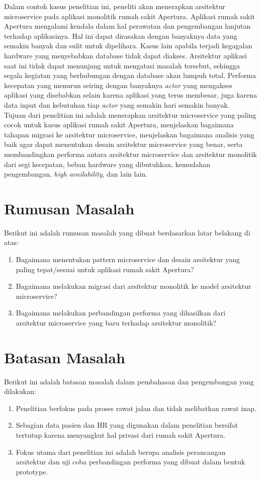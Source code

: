 Dalam contoh kasus penelitian ini, peneliti akan menerapkan arsitektur microservice pada aplikasi monolitik rumah sakit Apertura. Aplikasi rumah sakit Apertura mengalami kendala dalam hal perawatan dan pengembangan lanjutan terhadap aplikasinya. Hal ini dapat dirasakan dengan banyaknya data yang semakin banyak dan sulit untuk dipelihara. Kasus lain apabila terjadi kegagalan hardware yang menyebabkan database tidak dapat diakses. Arsitektur aplikasi saat ini tidak dapat menunjang untuk mengatasi masalah tersebut, sehingga segala kegiatan yang berhubungan dengan database akan lumpuh total. Performa kecepatan yang menurun seiring dengan banyaknya \textit{actor} yang mengakses aplikasi yang disebabkan selain karena aplikasi yang terus membesar, juga karena data input dan kebutuhan tiap \textit{actor} yang semakin hari semakin banyak.\\
Tujuan dari penelitian ini adalah menerapkan arsitektur microservice yang paling cocok untuk kasus aplikasi rumah sakit Apertura, menjelaskan bagaimana tahapan migrasi ke arsitektur microservice, menjelaskan bagaimana analisis yang baik agar dapat menentukan desain arsitektur microservice yang benar, serta membandingkan performa antara arsitektur microservice dan arsitektur monolitik dari segi kecepatan, beban hardware yang dibutuhkan, kemudahan pengembangan, \textit{high availability}, dan lain lain.

\section{Rumusan Masalah}
Berikut ini adalah rumusan masalah yang dibuat berdasarkan latar belakang di atas:
\begin {enumerate}[nolistsep, leftmargin=0.5cm]
\item Bagaimana menentukan pattern microservice dan desain arsitektur yang paling tepat/sesuai untuk aplikasi rumah sakit Apertura?
\item Bagaimana melakukan migrasi dari arsitektur monolitik ke model arsitektur microservice?
\item Bagaimana melakukan perbandingan performa yang dihasilkan dari arsitektur microservice yang baru terhadap arsitektur monolitik?
\end{enumerate}

\section{Batasan Masalah}
Berikut ini adalah batasan masalah dalam pembahasan dan pengembangan yang dilakukan:
\begin{enumerate}[nolistsep,leftmargin=0.5cm]
\item Penelitian berfokus pada proses rawat jalan dan tidak melibatkan rawat inap.
\item Sebagian data pasien dan HR yang digunakan dalam penelitian bersifat tertutup karena menyangkut hal privasi dari rumah sakit Apertura.
\item Fokus utama dari penelitian ini adalah berupa analisis perancangan arsitektur dan uji coba perbandingan performa yang dibuat dalam bentuk prototype. 
\end{enumerate}

